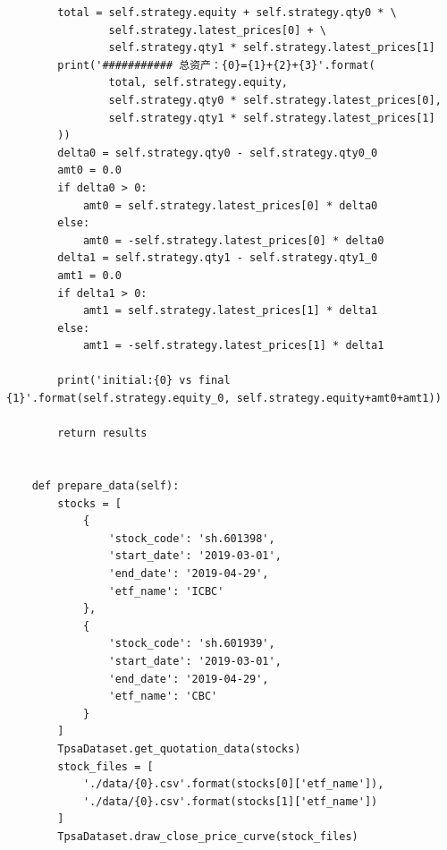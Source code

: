 \documentclass{article}
\begin{document}
\begin{lstlisting}
        total = self.strategy.equity + self.strategy.qty0 * \
                self.strategy.latest_prices[0] + \
                self.strategy.qty1 * self.strategy.latest_prices[1]
        print('########### 总资产：{0}={1}+{2}+{3}'.format(
                total, self.strategy.equity, 
                self.strategy.qty0 * self.strategy.latest_prices[0], 
                self.strategy.qty1 * self.strategy.latest_prices[1]
        ))
        delta0 = self.strategy.qty0 - self.strategy.qty0_0
        amt0 = 0.0
        if delta0 > 0:
            amt0 = self.strategy.latest_prices[0] * delta0
        else:
            amt0 = -self.strategy.latest_prices[0] * delta0
        delta1 = self.strategy.qty1 - self.strategy.qty1_0
        amt1 = 0.0
        if delta1 > 0:
            amt1 = self.strategy.latest_prices[1] * delta1
        else:
            amt1 = -self.strategy.latest_prices[1] * delta1
            
        print('initial:{0} vs final {1}'.format(self.strategy.equity_0, self.strategy.equity+amt0+amt1))
        
        return results
        
    
    def prepare_data(self):
        stocks = [
            {
                'stock_code': 'sh.601398',
                'start_date': '2019-03-01',
                'end_date': '2019-04-29',
                'etf_name': 'ICBC'
            }, 
            {
                'stock_code': 'sh.601939',
                'start_date': '2019-03-01',
                'end_date': '2019-04-29',
                'etf_name': 'CBC'
            }
        ]
        TpsaDataset.get_quotation_data(stocks)
        stock_files = [
            './data/{0}.csv'.format(stocks[0]['etf_name']),
            './data/{0}.csv'.format(stocks[1]['etf_name'])
        ]
        TpsaDataset.draw_close_price_curve(stock_files)

\end{lstlisting}
\end{document}
